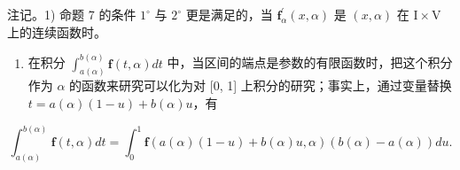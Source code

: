 注记。1) 命题 7 的条件 \(1^{\circ}\) 与 \(2^{\circ}\) 更是满足的，当 \(\mathbf{f}_{\alpha}^{\prime}(x,\alpha)\) 是 \((x,\alpha)\) 在 \(\mathrm{I} \times \mathrm{V}\) 上的连续函数时。

\begin{enumerate}
\def\labelenumi{\arabic{enumi})}
\setcounter{enumi}{1}
\tightlist
\item
  在积分 \(\int_{a(\alpha)}^{b(\alpha)}\mathbf{f}(t,\alpha)dt\) 中，当区间的端点是参数的有限函数时，把这个积分作为 \(\alpha\) 的函数来研究可以化为对 {[}0, 1{]} 上积分的研究；事实上，通过变量替换 \(t = a(\alpha)(1 - u) + b(\alpha)u\)，有
\end{enumerate}

\[
\int_ {a (\alpha)} ^ {b (\alpha)} \mathbf {f} (t, \alpha) d t = \int_ {0} ^ {1} \mathbf {f} (a (\alpha) (1 - u) + b (\alpha) u, \alpha) (b (\alpha) - a (\alpha)) d u.
\]

